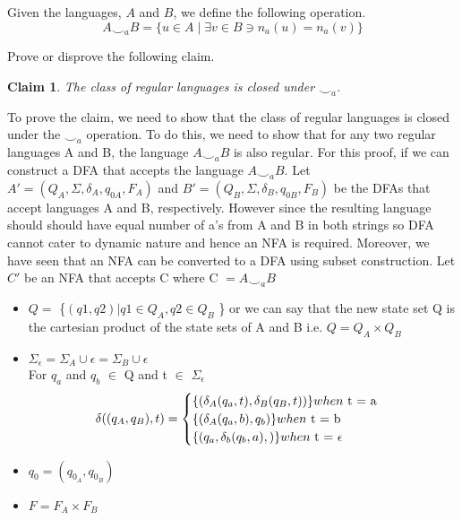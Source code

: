 \documentclass[addpoints]{exam}
\theoremstyle{claim}
\newtheorem{claim}{Claim}
\begin{document}
\begin{questions}
\begin{solution}
  \end{solution}
  
\question[35] Given the languages, $A$ and $B$, we define the following operation.
  \[
    A\smile_a B = \{ u\in A \mid \exists v\in B \ni n_a(u) = n_a(v) \}
  \]

  Prove or disprove the following claim.
  \begin{claim}
    The class of regular languages is closed under $\smile_a$.
  \end{claim}

  \begin{solution}
    To prove the claim, we need to show that the class of regular languages is closed under the $\smile_a$ operation. To do this, we need to show that for any two regular languages A and B, the language $A\smile_a B$ is also regular.
    For this proof, if we can construct a DFA that accepts the language $A\smile_a B$.
    Let $A' = (Q_A, \Sigma, \delta_A, q_{0A}, F_A)$ and $B' = (Q_B, \Sigma, \delta_B, q_{0B}, F_B)$ be the DFAs that accept languages A and B, respectively.
    However since the resulting language should should have equal number of a's from A and B in both strings so DFA cannot cater to dynamic nature and hence an NFA is required. Moreover, we have seen that an NFA can be converted to a DFA using subset construction. 
    Let $C'$ be an NFA that accepts C where C $=A \smile_a B$
    \begin{itemize}
      \item $Q =$ \{$(q1,q2) | q1 \in Q_A , q2 \in Q_B$ \} 
      or we can say that the new state set Q is the cartesian product of the state sets of A and B i.e. $Q = Q_A \times Q_B$
      \item $\Sigma_\epsilon = \Sigma_A \cup \epsilon = \Sigma_B \cup \epsilon $ \\
      For $q_a$ and $q_b$ $\in$ Q and t $\in$ $\Sigma_\epsilon$\\
        \[
       \delta((q_A, q_B), t) =
       \begin{cases} \{(\delta_A(q_a, t), \delta_B(q_B, t))\} when $  t = a$\\
       \{( \delta_A(q_a, b), q_b) \}  when $ t = b$\\
       \{( q_a, \delta_b(q_b, a), ) \}  when $ t = $\epsilon$ $\\
  
      \end{cases} \]
      \item $q_0 = (q_{0_A}, q_{0_B})$
      \item $F = F_A \times F_B$
      

\end{itemize}
\end{solution}
\end{questions}
\end{document}
